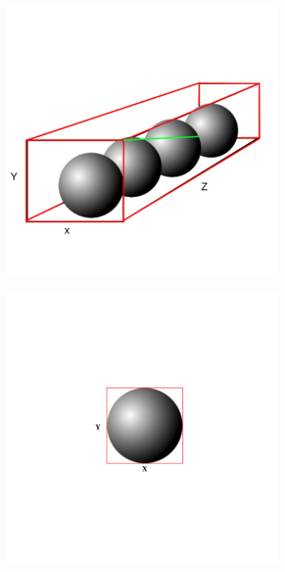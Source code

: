 \documentclass[11pt,a4paper]{article}
\begin{document}
\begin{figure}[H]	
     \centering
     \begin{subfigure}[t]{0.3\textwidth}
         \centering
         \includegraphics[width=\textwidth]{images/longaxis.png}
         \caption{}
         \label{fig:pi_4000}
     \end{subfigure}
     \hfill
     \begin{subfigure}[t]{0.3\textwidth}
         \centering
         \includegraphics[width=\textwidth]{images/LONGAXIS_Y.png}

\end{subfigure}
\end{figure}
\end{document}
